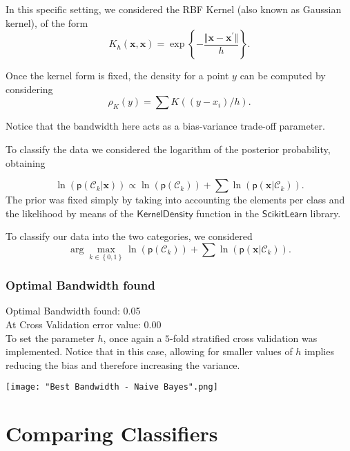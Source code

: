 \documentclass[a4paper]{article}
\begin{document}
In this specific setting, we considered the RBF Kernel (also known
as Gaussian kernel), of the form 
\begin{equation}
K_{h}\left(\mathbf{x},\mathbf{x}\right)=\exp\left\{ -\frac{\Vert\mathbf{x}-\mathbf{x^{\prime}}\Vert}{h}\right\} .\label{eq:-16}
\end{equation}

Once the kernel form is fixed, the density for a point $y$ can be
computed by considering 
\[
\rho_{K}\left(y\right)=\sum K\left(\left(y-x_{i}\right)/h\right).
\]

Notice that the bandwidth here acts as a bias-variance trade-off parameter.

To classify the data we considered the logarithm of the posterior
probability, obtaining

\begin{equation}
\ln\left(\mathsf{p}\left(\mathcal{C}_{k}|\mathbf{x}\right)\right)\propto\ln\left(\mathsf{p}\left(\mathcal{C}_{k}\right)\right)+\sum\ln\left(\mathsf{p}\left(\mathbf{x}|\mathcal{C}_{k}\right)\right).\label{eq:-17}
\end{equation}
The prior was fixed simply by taking into accounting the elements
per class and the likelihood by means of the $\mathsf{KernelDensity}$
function in the $\mathsf{ScikitLearn}$ library.

To classify our data into the two categories, we considered 
\begin{equation}
\arg\underset{k\in\left\{ 0,1\right\} }{\max}\ln\left(\mathsf{p}\left(\mathcal{C}_{k}\right)\right)+\sum\ln\left(\mathsf{p}\left(\mathbf{x}|\mathcal{C}_{k}\right)\right).\label{eq:-18}
\end{equation}

\subsubsection{Optimal Bandwidth found}

Optimal Bandwidth found: 0.05\\
At Cross Validation error value: 0.00\\

To set the parameter $h$, once again a $5$-fold stratified cross validation was implemented.
Notice that in this case, allowing for smaller values of $h$ implies reducing the bias and therefore increasing the variance.

\texttt{[image: "Best Bandwidth - Naive Bayes".png]}

\section{Comparing Classifiers}
\end{document}
